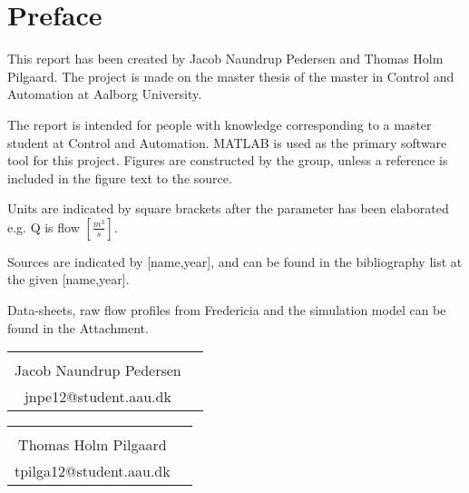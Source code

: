 \chapter*{Preface}
This report has been created by Jacob Naundrup Pedersen and Thomas Holm Pilgaard. The project is made on the master thesis of the master in Control and Automation at Aalborg University. 

The report is intended for people with knowledge corresponding to a master student at Control and Automation. MATLAB is used as the primary software tool for this project. Figures are constructed by the group, unless a reference is included in the figure text to the source.  

Units are indicated by square brackets after the parameter has been elaborated e.g. Q is flow $\left[\frac{m^3}{s}\right]$. 

Sources are indicated by [name,year], and can be found in the bibliography list at the given
[name,year].

Data-sheets, raw flow profiles from Fredericia and the simulation model can be found in the Attachment.

\vfill

\begin{table}[H]
	\centering
		\begin{tabular}{c c }
			\underline{\phantom{mmmmmmmmmmmmmmmmmmm}}       \\
			Jacob Naundrup Pedersen \\
			jnpe12@student.aau.dk \\


		\end{tabular}
				\begin{tabular}{c c }
			\underline{\phantom{mmmmmmmmmmmmmmmmmmm}}       \\
			Thomas Holm Pilgaard \\
			tpilga12@student.aau.dk\\

			
		\end{tabular}
		
\end{table}

